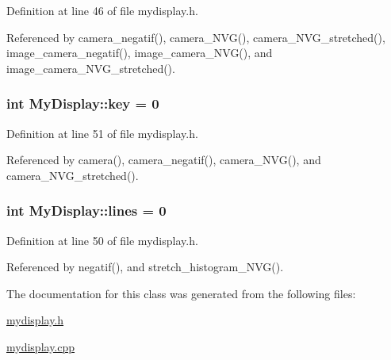 Definition at line 46 of file mydisplay.\-h.



Referenced by camera\-\_\-negatif(), camera\-\_\-\-N\-V\-G(), camera\-\_\-\-N\-V\-G\-\_\-stretched(), image\-\_\-camera\-\_\-negatif(), image\-\_\-camera\-\_\-\-N\-V\-G(), and image\-\_\-camera\-\_\-\-N\-V\-G\-\_\-stretched().

\hypertarget{classMyDisplay_af7602dfb0020925158d89532de80135e}{
\subsubsection[{key}]{\setlength{\rightskip}{0pt plus 5cm}int My\-Display\-::key = 0\hspace{0.3cm}{\ttfamily [private]}}}\label{classMyDisplay_af7602dfb0020925158d89532de80135e}


Definition at line 51 of file mydisplay.\-h.



Referenced by camera(), camera\-\_\-negatif(), camera\-\_\-\-N\-V\-G(), and camera\-\_\-\-N\-V\-G\-\_\-stretched().

\hypertarget{classMyDisplay_a2cb48c4b915895b0bc7e7cd0f524a3be}{
\subsubsection[{lines}]{\setlength{\rightskip}{0pt plus 5cm}int My\-Display\-::lines = 0\hspace{0.3cm}{\ttfamily [private]}}}\label{classMyDisplay_a2cb48c4b915895b0bc7e7cd0f524a3be}


Definition at line 50 of file mydisplay.\-h.



Referenced by negatif(), and stretch\-\_\-histogram\-\_\-\-N\-V\-G().



The documentation for this class was generated from the following files\-:\begin{DoxyCompactItemize}
\item 
\hyperlink{mydisplay_8h}{mydisplay.\-h}\item 
\hyperlink{mydisplay_8cpp}{mydisplay.\-cpp}\end{DoxyCompactItemize}
